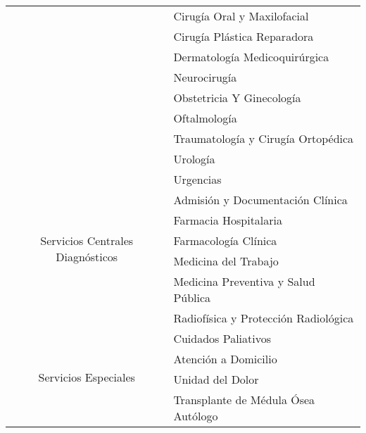 \begin{table}[H]
\begin{tabular}{cl}
                                                            & Cirugía Oral y Maxilofacial          \\
                                                            & Cirugía Plástica Reparadora          \\
                                                            & Dermatología Medicoquirúrgica        \\
                                                            & Neurocirugía                         \\
                                                            & Obstetricia Y Ginecología            \\
                                                            & Oftalmología                         \\
                                                            & Traumatología y Cirugía Ortopédica   \\
                                                            & Urología                             \\
        \midrule
        \multirow{7}{*}{Servicios   Centrales Diagnósticos} & Urgencias                            \\
                                                            & Admisión y Documentación Clínica     \\
                                                            & Farmacia Hospitalaria                \\
                                                            & Farmacología Clínica                 \\
                                                            & Medicina del Trabajo                 \\
                                                            & Medicina Preventiva y Salud Pública  \\
                                                            & Radiofísica y Protección Radiológica \\
        \midrule
        \multirow{7}{*}{Servicios   Especiales}             & Cuidados Paliativos                  \\
                                                            & Atención a Domicilio                 \\
                                                            & Unidad del Dolor                     \\
                                                            & Transplante de Médula Ósea Autólogo  \\

\end{tabular}
\end{table}
